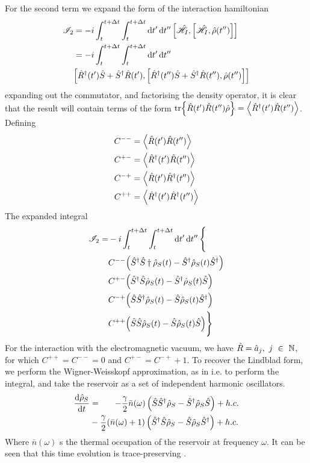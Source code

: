 For the second term we expand the form of the interaction hamiltonian
\begin{align*}
  \mathscr{I}_2 &= -i\int_t^{t+\Delta t} \int_t^{t+\Delta t} \dd{t'} \dd{t''} \comm{\ham_I}{\comm{\ham_I}{\dens(t'')}}\\
                &= -i\int_t^{t+\Delta t} \int_t^{t+\Delta t} \dd{t'} \dd{t''} \\
                &\comm{\hres{t'}}{\comm{\hres{t''}}{\dens(t'')}}
\end{align*}
expanding out the commutator, and factorising the density operator, it is clear that the result will contain terms of the form $\tr{\hat{R}(t')\hat{R}(t'')\dens} = \ev{\hat{R}^\dagger(t') \hat{R}(t'')}$. Defining 
\begin{align}
  C^{--} &= \ev{\hat{R}(t') \hat{R}(t'')}\\
  C^{+-} &= \ev{\hat{R}^\dagger(t') \hat{R}(t'')}\\
  C^{-+} &= \ev{\hat{R}(t') \hat{R}^\dagger(t'')}\\
  C^{++} &= \ev{\hat{R}^\dagger(t') \hat{R}^\dagger(t'')}
\end{align}
The expanded integral
\begin{align}
  \mathscr{I}_2 =  &-i\int_t^{t+\Delta t} \int_t^{t+\Delta t} \dd{t'}\dd{t''} \Bigg\{\\
                   &C^{--}\Big(\hat{S}^\dagger \hat{S} \dagger \hat{\rho}_S(t) - \hat{S}^\dagger \hat{\rho}_S(t) \hat{S}^\dagger \Big)\\
                   &C^{+-}\Big(\hat{S}^\dagger \hat{S} \hat{\rho}_S(t) - \hat{S}^\dagger \hat{\rho}_S(t) \hat{S} \Big)\\
                   &C^{-+}\Big(\hat{S} \hat{S}^\dagger \hat{\rho}_S(t) - \hat{S} \hat{\rho}_S(t) \hat{S}^\dagger \Big)\\
                   &C^{++}\Big(\hat{S} \hat{S} \hat{\rho}_S(t) - \hat{S} \hat{\rho}_S(t) \hat{S} \Big) \Bigg\}
\end{align}
For the interaction with the electromagnetic vacuum, we have $\hat{R} = \ann_j,\ j\ \in\ \mathbb{N}$, for which $C^{++}=C^{--}=0$ and $C^{+-}=C^{-+}+1$.
To recover the Lindblad form, we perform the Wigner-Weisskopf approximation, as in i.e. \cite{Meystre2007} to perform the integral, and take the reservoir as a set of independent harmonic oscillators.
\begin{align}
  \dv{\hat{\rho}_S}{t} &= \quad \ \ -\frac{\gamma}{2} \bar{n}(\omega) \left(\hat{S}\hat{S}^\dagger\hat{\rho}_S - \hat{S}^\dagger \hat{\rho}_S \hat{S}\right) + h.c. \\
                  &- \frac{\gamma}{2} (\bar{n}(\omega) + 1) \left(\hat{S}^\dagger\hat{S}\hat{\rho}_S - \hat{S} \hat{\rho}_S \hat{S}^\dagger\right) + h.c.
\end{align} 
Where $\bar{n}(\omega)$ s the thermal occupation of the reservoir at frequency $\omega$. 
It can be seen that this time evolution is trace-preserving \cite{Lukin2006}.
